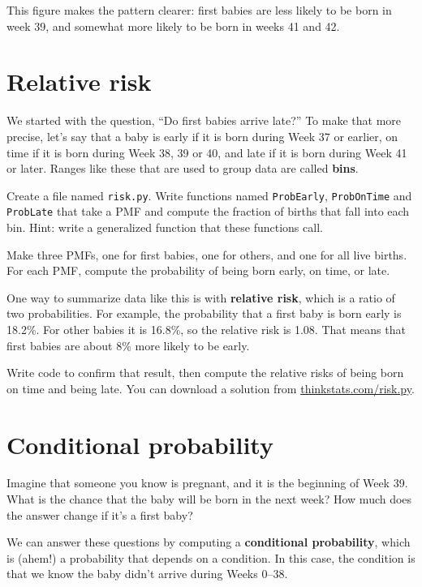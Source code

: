 \documentclass[12pt]{book}
\begin{document}
This figure makes the pattern clearer: first babies are
less likely to be born in week 39, and somewhat more likely
to be born in weeks 41 and 42.


\section{Relative risk}
\label{relative.risk}

We started with the question, ``Do first babies arrive late?''  To
make that more precise, let's say that a baby is early if it is born
during Week 37 or earlier, on time if it is born during Week 38, 39 or
40, and late if it is born during Week 41 or later.  Ranges like these
that are used to group data are called {\bf bins}.

\begin{ex}

Create a file named {\tt risk.py}.
Write functions named {\tt ProbEarly}, {\tt ProbOnTime} and
{\tt ProbLate} that take a PMF and compute the fraction of births
that fall into each bin.  Hint: write a generalized function
that these functions call.

Make three PMFs, one for first babies, one for others, and one for
all live births.  For each PMF, compute the probability of being
born early, on time, or late.

One way to summarize data like this is with {\bf relative risk},
which is a ratio of two probabilities.  For example, the probability
that a first baby is born early is 18.2\%.  For other babies it is
16.8\%, so the relative risk is 1.08.  That means that first babies
are about 8\% more likely to be early.

Write code to confirm that result, then compute the relative risks of
being born on time and being late.  You can download a solution
from \url{thinkstats.com/risk.py}.

\end{ex}


\section{Conditional probability}

Imagine that someone you know is pregnant, and it is the beginning of
Week 39.  What is the chance that the baby will be born in the next
week?  How much does the answer change if it's a first baby?

We can answer these questions by computing a {\bf conditional
probability}, which is (ahem!) a probability that depends on a condition.
In this case, the condition is that we know the baby didn't arrive
during Weeks 0--38.
\end{document}
